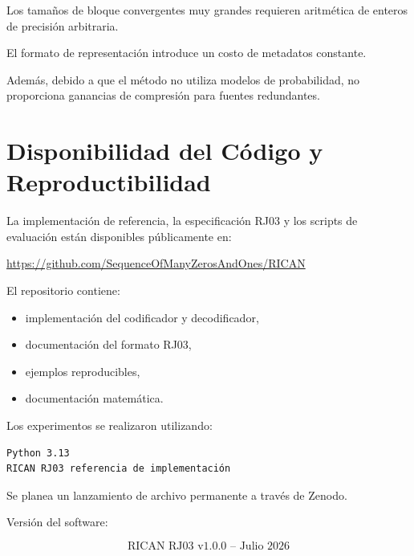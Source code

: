 \documentclass[onecolumn]{IEEEtran}
\begin{document}
Los tamaños de bloque convergentes muy grandes requieren aritmética
de enteros de precisión arbitraria.

El formato de representación introduce un costo de metadatos
constante.

Además, debido a que el método no utiliza modelos de probabilidad, no
proporciona ganancias de compresión para fuentes redundantes.


\section{Disponibilidad del Código y Reproductibilidad}

La implementación de referencia, la especificación RJ03 y los scripts
de evaluación están disponibles públicamente en:

\begin{center}
\url{https://github.com/SequenceOfManyZerosAndOnes/RICAN}
\end{center}

El repositorio contiene:

\begin{itemize}

\item implementación del codificador y decodificador,

\item documentación del formato RJ03,

\item ejemplos reproducibles,

\item documentación matemática.

\end{itemize}

Los experimentos se realizaron utilizando:

\begin{verbatim}
Python 3.13
RICAN RJ03 referencia de implementación
\end{verbatim}

Se planea un lanzamiento de archivo permanente a través de Zenodo.

Versión del software:

\[
\text{RICAN RJ03 v1.0.0 -- Julio 2026}
\]

\end{document}
